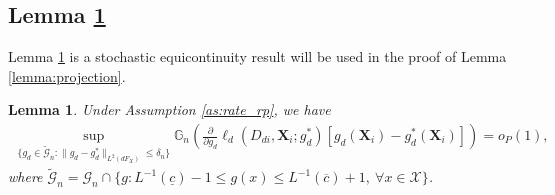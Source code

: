 \documentclass[11pt]{article}
\newtheorem{lemma}[thm]{Lemma}
\numberwithin{equation}{section}
\begin{document}
\subsection{Lemma \ref{lemma:several_results}}
Lemma \ref{lemma:several_results} is a stochastic equicontinuity result will be used in the proof of Lemma \ref{lemma:projection}.
\begin{lemma}\label{lemma:several_results}
	Under Assumption \ref{as:rate_rp},  we have
	\begin{align*}
		\sup_{\{g_d\in \widetilde{\mathcal{G}}_n:\|g_d-g_d^*\|_{L^2(dF_X)}\leq \delta_n\}} \mathbb{G}_n\left(\frac{\partial}{\partial g_d}\ell_d(D_{di},\boldsymbol{X}_{i};g^*_d)[ g_d(\boldsymbol{X}_{i})-g_d^*(\boldsymbol{X}_{i})]\right)=o_P(1),
	\end{align*}
	where $\widetilde{\mathcal{G}}_n=\mathcal{G}_n\cap \{g: L^{-1}(\underline{c})-1\leq g(x)\leq  L^{-1}(\overline{c})+1,\  \forall x\in\mathcal{X}\}$.
\end{lemma}
\end{document}
